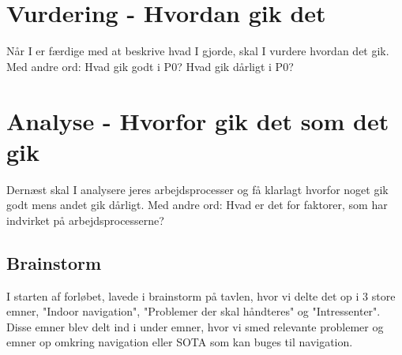 \documentclass[a4paper,12pt,twoside,openright]{memoir}
\begin{document}
    \section{Vurdering - Hvordan gik det}
    Når I er færdige med at beskrive hvad I gjorde, skal I vurdere hvordan det gik. Med andre ord: Hvad gik godt i P0? Hvad gik dårligt i P0? 

    \section{Analyse - Hvorfor gik det som det gik}
    Dernæst skal I analysere jeres arbejdsprocesser og få klarlagt hvorfor noget gik godt mens andet gik dårligt. Med andre ord: Hvad er det for faktorer, som har indvirket på arbejdsprocesserne? 

        \subsection{Brainstorm}
        I starten af forløbet, lavede i brainstorm på tavlen, hvor vi delte det op i 3 store  emner, "Indoor navigation", "Problemer der skal håndteres" og "Intressenter". Disse emner blev delt ind i under emner, hvor vi smed relevante problemer og emner op omkring navigation eller SOTA som kan buges til navigation. 
\end{document}
